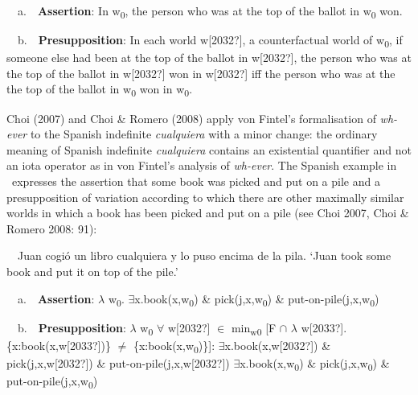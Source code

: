 \begin{styleStandard}
\ \ a.\ \ \textbf{Assertion}: In w\textsubscript{0}, the person who was at the top of the ballot in w\textsubscript{0} won.
\end{styleStandard}

\begin{styleStandard}
\ \ b.\ \ \textbf{Presupposition}: In each world w[2032?], a counterfactual world of w\textsubscript{0}, if someone else had been at the top of the ballot in w[2032?], the person who was at the top of the ballot in w[2032?] won in w[2032?] iff the person who was at the the top of the ballot in w\textsubscript{0} won in w\textsubscript{0}.
\end{styleStandard}

\begin{styleStandard}
Choi (2007) and Choi \& Romero (2008) apply von Fintel’s formalisation of \textit{wh-ever} to the Spanish indefinite \textit{cualquiera} with a minor change: the ordinary meaning of Spanish indefinite \textit{cualquiera} contains an existential quantifier and not an iota operator as in von Fintel’s analysis of \textit{wh-ever}. The Spanish example in \ expresses the assertion that some book was picked and put on a pile and a presupposition of variation according to which there are other maximally similar worlds in which a book has been picked and put on a pile (see Choi 2007, Choi \& Romero 2008: 91):
\end{styleStandard}

\begin{styleStandard}
\label{bkm:Ref517736}\ \ Juan cogió un libro cualquiera y lo puso encima de la pila. ‘Juan took some book and put it on top of the pile.’ 
\end{styleStandard}

\begin{styleStandard}
\ \ a.\ \ \textbf{Assertion}: $\lambda $ w\textsubscript{0}. ${\exists}$x.book(x,w\textsubscript{0}) \& pick(j,x,w\textsubscript{0}) \& put-on-pile(j,x,w\textsubscript{0})
\end{styleStandard}

\begin{styleStandard}
\ \ b.\ \ \textbf{Presupposition}: \newline
$\lambda $ w\textsubscript{0 }${\forall}$ w[2032?] ${\in}$ min\textsubscript{w0} [F ${\cap}$ $\lambda $ w[2033?]. \{x:book(x,w[2033?])\} ${\neq}$ \{x:book(x,w\textsubscript{0})\}]:\newline
${\exists}$x.book(x,w[2032?]) \& pick(j,x,w[2032?]) \& put-on-pile(j,x,w[2032?])\newline
${\exists}$x.book(x,w\textsubscript{0}) \& pick(j,x,w\textsubscript{0}) \& put-on-pile(j,x,w\textsubscript{0})
\end{styleStandard}

